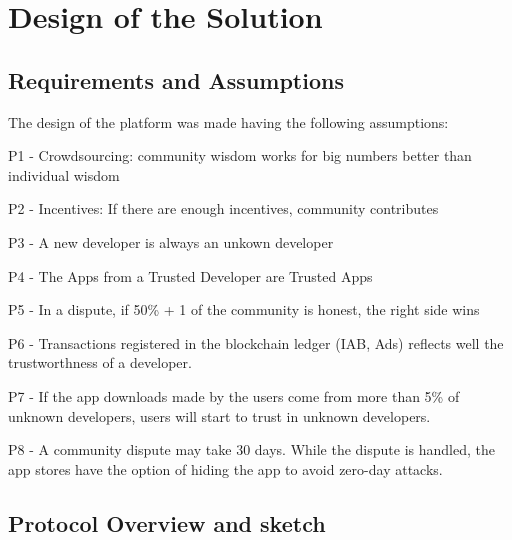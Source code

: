 \section{Design of the Solution}

\label{sec:design}


\subsection{Requirements and Assumptions }


The design of the platform was made having the following assumptions:

P1 - Crowdsourcing: community wisdom works for big numbers better than individual wisdom

P2 - Incentives: If there are enough incentives, community contributes

P3 - A new developer is always an unkown developer

P4 - The Apps from a Trusted Developer are Trusted Apps

P5 - In a dispute, if 50\% + 1 of the community is honest, the right side wins

P6 - Transactions registered in the blockchain ledger (IAB, Ads) reflects well the trustworthness of a developer.

P7 - If the app downloads made by the users come from more than 5\% of unknown developers, users will start to trust in unknown developers.

P8 - A community dispute may take 30 days. While the dispute is handled, the app stores have the option of hiding the app to avoid zero-day attacks.


\subsection{Protocol Overview and sketch}





%


